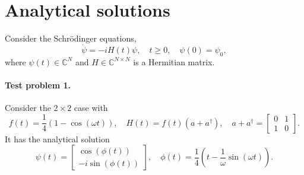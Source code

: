 \documentclass[11pt]{article}
\begin{document}



\section{Analytical solutions}
Consider the Schr\"odinger equations,
\begin{equation}\label{eq_shrodinger}
\dot{\psi} = -i H(t) \psi,\quad t\geq 0,\quad \psi(0) = \psi_0,
\end{equation}
where $\psi(t)\in {\mathbb C}^N$ and $H\in {\mathbb C}^{N\times N}$ is a Hermitian matrix.
\paragraph{Test problem 1.}
Consider the $2\times 2$ case with
\[
f(t) = \frac{1}{4}\left(1 - \cos(\omega t)\right),\quad H(t) = f(t) (a +a^\dag),\quad a+ a^\dag
=
\begin{bmatrix}
  0 & 1\\
  1 & 0
\end{bmatrix}.
\]
It has the analytical solution
\[
\psi(t) = \begin{bmatrix}
  \cos(\phi(t))\\
  -i\sin(\phi(t))
  \end{bmatrix},\quad \phi(t) = \frac{1}{4}\left( t - \frac{1}{\omega}\sin(\omega t)\right).
\]
\end{document}
